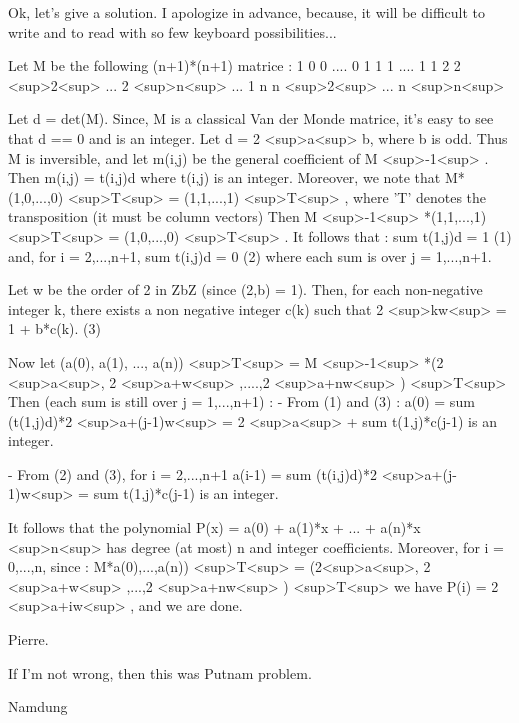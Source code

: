 \begin{solution}
	Ok, let's give a solution. I apologize in advance, because, it will be difficult to write and to read with so few keyboard possibilities...

Let M be the following (n+1)*(n+1) matrice :
1  0  0 ....  0
1  1  1 .... 1
1  2  2 <sup>2<\/sup> ...  2 <sup>n<\/sup> 
...
1  n  n <sup>2<\/sup> ...  n <sup>n<\/sup>

Let d = det(M). Since, M is a classical Van der Monde matrice, it's easy to see that d =\/= 0 and is an integer.
Let d = 2 <sup>a<\/sup> b, where b is odd.
Thus M is inversible, and let m(i,j) be the general coefficient of M <sup>-1<\/sup> .
Then m(i,j) = t(i,j)\/d where t(i,j) is an integer.
Moreover, we note that M*(1,0,...,0) <sup>T<\/sup> = (1,1,...,1) <sup>T<\/sup> , where 'T' denotes the transposition (it must be column vectors)
Then M <sup>-1<\/sup> *(1,1,...,1) <sup>T<\/sup> = (1,0,...,0) <sup>T<\/sup> . It follows that :
sum t(1,j)\/d = 1   (1)
and, for i = 2,...,n+1,   sum t(i,j)\/d  = 0   (2)
where each sum is over j = 1,...,n+1.

Let w be the order of 2 in Z\/bZ  (since (2,b) = 1). Then, for each non-negative integer k, there exists a non negative integer c(k) such that 2 <sup>kw<\/sup> = 1 + b*c(k).   (3)

Now let (a(0), a(1), ..., a(n)) <sup>T<\/sup> = M <sup>-1<\/sup> *(2 <sup>a<\/sup>, 2 <sup>a+w<\/sup> ,....,2 <sup>a+nw<\/sup> ) <sup>T<\/sup>
Then (each sum is still over j = 1,...,n+1) :
- From (1) and (3) :
a(0) = sum (t(1,j)\/d)*2 <sup>a+(j-1)w<\/sup> = 2 <sup>a<\/sup>  + sum t(1,j)*c(j-1)   is an integer.

- From (2) and (3), for i = 2,...,n+1
a(i-1) = sum (t(i,j)\/d)*2 <sup>a+(j-1)w<\/sup> = sum t(1,j)*c(j-1)   is an integer.

It follows that the polynomial P(x) = a(0) + a(1)*x + ... + a(n)*x <sup>n<\/sup> has degree (at most) n and integer coefficients. Moreover, for i = 0,...,n, since :
M*a(0),...,a(n)) <sup>T<\/sup> = (2<sup>a<\/sup>, 2 <sup>a+w<\/sup> ,...,2 <sup>a+nw<\/sup> ) <sup>T<\/sup> 
we have P(i) = 2 <sup>a+iw<\/sup> , and we are done.

Pierre.
\end{solution}



\begin{solution}
	If I'm not wrong, then this was Putnam problem.

Namdung
\end{solution}



